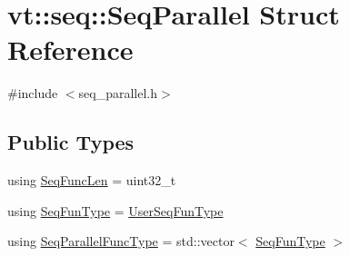 \hypertarget{structvt_1_1seq_1_1_seq_parallel}{}\section{vt\+:\+:seq\+:\+:Seq\+Parallel Struct Reference}
\label{structvt_1_1seq_1_1_seq_parallel}


{\ttfamily \#include $<$seq\+\_\+parallel.\+h$>$}

\subsection*{Public Types}
\begin{DoxyCompactItemize}
\item 
using \hyperlink{structvt_1_1seq_1_1_seq_parallel_ab6a1d3fc6dbc5210e559c96f57f64e79}{Seq\+Func\+Len} = uint32\+\_\+t
\item 
using \hyperlink{structvt_1_1seq_1_1_seq_parallel_ad113b4ac8767561a01332867ed6406c7}{Seq\+Fun\+Type} = \hyperlink{namespacevt_1_1seq_aeb4674d25dcb5d27248b68ec83fad2b6}{User\+Seq\+Fun\+Type}
\item 
using \hyperlink{structvt_1_1seq_1_1_seq_parallel_a5804979becb9986676dcba10487eb8de}{Seq\+Parallel\+Func\+Type} = std\+::vector$<$ \hyperlink{structvt_1_1seq_1_1_seq_parallel_ad113b4ac8767561a01332867ed6406c7}{Seq\+Fun\+Type} $>$
\end{DoxyCompactItemize}
